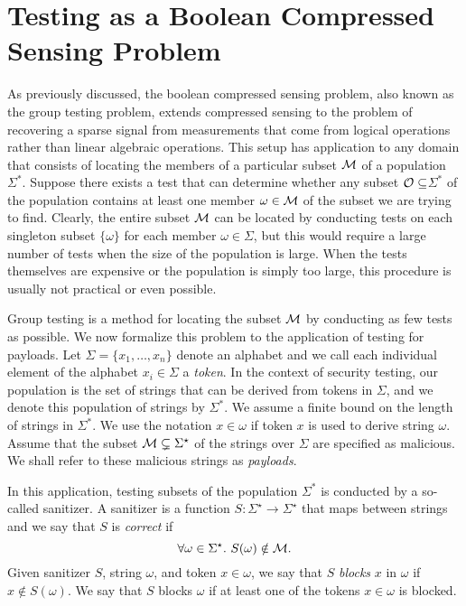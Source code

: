\section{Testing as a Boolean Compressed Sensing Problem}
As previously discussed, the boolean compressed sensing problem, also known as the group testing problem, extends compressed sensing to the problem of recovering a sparse signal from measurements that come from logical operations rather than linear algebraic operations. This setup has application to any domain that consists of locating the members of a particular subset $\cal{M}$ of a population $\Sigma^*$. Suppose there exists a test that can determine whether any subset $\cal{O}\subseteq$$\Sigma^*$ of the population contains at least one member $\omega\in\cal{M}$ of the subset we are trying to find. Clearly, the entire subset $\cal{M}$ can be located by conducting tests on each singleton subset $\{\omega\}$ for each member $\omega\in\Sigma$, but this would require a large number of tests when the size of the population is large.  When the tests themselves are expensive or the population is simply too large, this procedure is usually not practical or even possible.  

Group testing is a method for locating the subset $\cal{M}$ by conducting as few tests as possible. We now formalize this problem to the application of testing for payloads. Let $\Sigma=\{ x_1,\ldots,x_n \}$ denote an alphabet and we call each individual element of the alphabet $x_i\in\Sigma$ a \emph{token}. In the context of security testing, our population is the set of strings that can be derived from tokens in $\Sigma$, and we denote this population of strings by $\Sigma^*$. We assume a finite bound on the length of strings in $\Sigma^*$. We use the notation $x\in\omega$ if token $x$ is used to derive string $\omega$. Assume that the subset ${\cal M} \subsetneq \Sigma^{\star}$ of the strings over $\Sigma$ are specified as malicious. We shall refer to these malicious strings as \emph{payloads}. 

In this application, testing subsets of the population $\Sigma^*$ is conducted by a so-called sanitizer. A sanitizer is a function 
$S \colon \Sigma^{\star} \rightarrow \Sigma^{\star}$ that maps between strings and we say that $S$ is \emph{correct} if
$$
\forall \omega \in \Sigma^{\star}.\ S(\omega) \notin {\cal M}.
$$ 
Given sanitizer $S$, string $\omega$, and token $x \in \omega$, we say that $S$ \emph{blocks} $x$ in $\omega$ if $x \notin S(\omega)$. We say that $S$ blocks $\omega$ if at least one of the tokens $x \in \omega$ is blocked.

